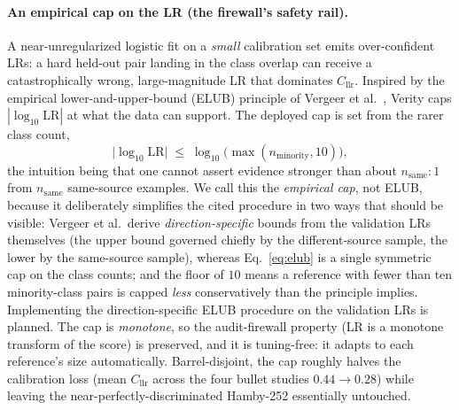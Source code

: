 \documentclass[11pt]{article}
\newcommand{\Cllr}{C_{\mathrm{llr}}}
\begin{document}
\paragraph{An empirical cap on the LR (the firewall's safety rail).}
A near-unregularized logistic fit on a \emph{small} calibration set emits
over-confident LRs: a hard held-out pair landing in the class overlap can receive a
catastrophically wrong, large-magnitude LR that dominates $\Cllr$. Inspired by the
empirical lower-and-upper-bound (ELUB) principle of Vergeer et
al.~\cite{vergeer2016}, Verity caps $|\log_{10}\mathrm{LR}|$ at what the data can
support. The deployed cap is set from the rarer class count,
\begin{equation}
  \big|\log_{10}\mathrm{LR}\big| \;\le\; \log_{10}\!\big(\max(n_{\text{minority}},10)\big),
  \label{eq:elub}
\end{equation}
the intuition being that one cannot assert evidence stronger than about
$n_{\text{same}}\!:\!1$ from $n_{\text{same}}$ same-source examples. We call this
the \emph{empirical cap}, not ELUB, because it deliberately simplifies the cited
procedure in two ways that should be visible: Vergeer et al.\ derive
\emph{direction-specific} bounds from the validation LRs themselves (the upper
bound governed chiefly by the different-source sample, the lower by the
same-source sample), whereas Eq.~\eqref{eq:elub} is a single symmetric cap on the
class counts; and the floor of $10$ means a reference with fewer than ten
minority-class pairs is capped \emph{less} conservatively than the principle
implies. Implementing the direction-specific ELUB procedure on the validation LRs
is planned. The cap is
\emph{monotone}, so the audit-firewall property (LR is a monotone transform of the
score) is preserved, and it is tuning-free: it adapts to each reference's size
automatically. Barrel-disjoint, the cap roughly halves the calibration loss
(mean $\Cllr$ across the four bullet studies $0.44 \to 0.28$) while leaving the
near-perfectly-discriminated Hamby-252 essentially untouched.
\end{document}
